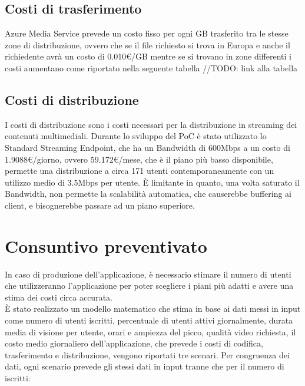 \subsection{Costi di trasferimento}
Azure Media Service prevede un costo fisso per ogni GB trasferito tra le stesse zone di distribuzione, ovvero che se il file richiesto si trova in Europa e anche il richiedente avrà un costo di 0.010€/GB mentre se si trovano in zone differenti i costi aumentano come riportato nella seguente tabella //TODO: link alla tabella

\subsection{Costi di distribuzione}
\label{subsec:costi-distribuzione}
I costi di distribuzione sono i costi necessari per la distribuzione in streaming dei contenuti multimediali. Durante lo sviluppo del PoC è stato utilizzato lo Standard Streaming Endpoint, che ha un Bandwidth di 600Mbps a un costo di 1.9088€/giorno, ovvero 59.172€/mese, che è il piano più basso disponibile, permette una distribuzione a circa 171 utenti contemporaneamente con un utilizzo medio di 3.5Mbps per utente. È limitante in quanto, una volta saturato il Bandwidth, non permette la scalabilità automatica, che causerebbe buffering ai client, e bisognerebbe passare ad un piano superiore.\\

\section{Consuntivo preventivato}
In caso di produzione dell'applicazione, è necessario stimare il numero di utenti che utilizzeranno l'applicazione per poter scegliere i piani più adatti e avere una stima dei costi circa accurata.\\
È stato realizzato un modello matematico che stima in base ai dati messi in input come numero di utenti iscritti, percentuale di utenti attivi giornalmente, durata media di visione per utente, orari e ampiezza del picco, qualità video richiesta, il costo medio giornaliero dell'applicazione, che prevede i costi di codifica, trasferimento e distribuzione, vengono riportati tre scenari.
Per congruenza dei dati, ogni scenario prevede gli stessi dati in input tranne che per il numero di iscritti:

